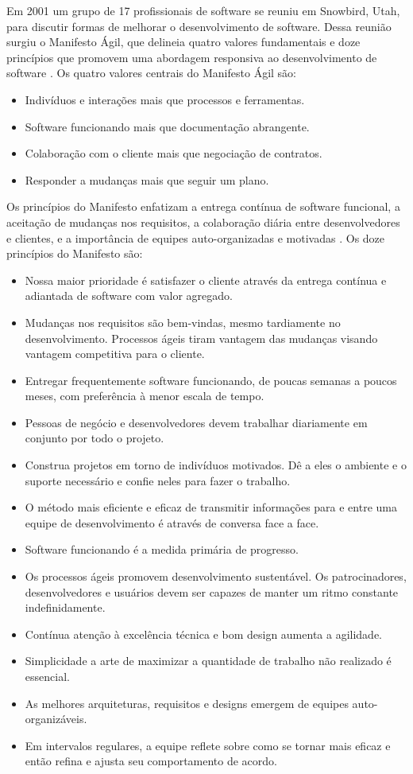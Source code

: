 \documentclass[
	12pt,
	openright,
	twoside,
	a4paper,
	english,
	brazil
	]{abntex2}
\begin{document}
Em 2001 um grupo de 17 profissionais de software se reuniu em Snowbird, Utah, para discutir formas de melhorar o desenvolvimento de software. Dessa reunião surgiu o Manifesto Ágil, que delineia quatro valores fundamentais e doze princípios que promovem uma abordagem responsiva ao desenvolvimento de software \cite{AgileManifest}. Os quatro valores centrais do Manifesto Ágil são:

\begin{itemize}
  \item Indivíduos e interações mais que processos e ferramentas.
  \item Software funcionando mais que documentação abrangente.
  \item Colaboração com o cliente mais que negociação de contratos.
  \item Responder a mudanças mais que seguir um plano.
\end{itemize}
  
Os princípios do Manifesto enfatizam a entrega contínua de software funcional, a aceitação de mudanças nos requisitos, a colaboração diária entre desenvolvedores e clientes, e a importância de equipes auto-organizadas e motivadas \cite{AgileManifest}. Os doze princípios do Manifesto são:
\begin{itemize}
  \item Nossa maior prioridade é satisfazer o cliente através da entrega contínua e adiantada de software com valor agregado.
  \item Mudanças nos requisitos são bem-vindas, mesmo tardiamente no desenvolvimento. Processos ágeis tiram vantagem das mudanças visando vantagem competitiva para o cliente.
  \item Entregar frequentemente software funcionando, de poucas semanas a poucos meses, com preferência à menor escala de tempo.
  \item Pessoas de negócio e desenvolvedores devem trabalhar diariamente em conjunto por todo o projeto.
  \item Construa projetos em torno de indivíduos motivados. Dê a eles o ambiente e o suporte necessário e confie neles para fazer o trabalho.
  \item O método mais eficiente e eficaz de transmitir informações para e entre uma equipe de desenvolvimento é através de conversa face a face.
  \item Software funcionando é a medida primária de progresso.
  \item Os processos ágeis promovem desenvolvimento sustentável. Os patrocinadores, desenvolvedores e usuários devem ser capazes de manter um ritmo constante indefinidamente.
  \item Contínua atenção à excelência técnica e bom design aumenta a agilidade.
  \item Simplicidade \- a arte de maximizar a quantidade de trabalho não realizado \- é essencial.
  \item As melhores arquiteturas, requisitos e designs emergem de equipes auto-organizáveis.
  \item Em intervalos regulares, a equipe reflete sobre como se tornar mais eficaz e então refina e ajusta seu comportamento de acordo.
\end{itemize}
\end{document}
